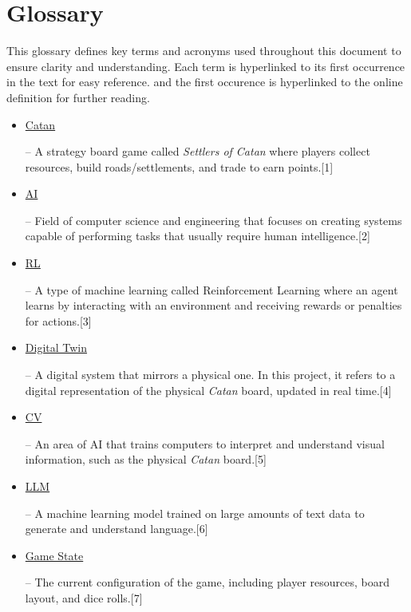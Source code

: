 \documentclass{article}
\newcommand{\CatanExt}{\href{https://en.wikipedia.org/wiki/Catan}{Catan}}
\newcommand{\AIExt}{\href{https://en.wikipedia.org/wiki/Artificial_intelligence}{AI}}
\newcommand{\RLExt}{\href{https://www.ibm.com/think/topics/reinforcement-learning}{RL}}
\newcommand{\DigitalTwinExt}{\href{https://en.wikipedia.org/wiki/Digital_twin}{Digital Twin}}
\newcommand{\CVExt}{\href{https://www.ibm.com/think/topics/computer-vision}{CV}}
\newcommand{\LLMExt}{\href{https://www.cloudflare.com/learning/ai/what-is-large-language-model/}{LLM}}
\newcommand{\GameStateExt}{\href{https://milvus.io/ai-quick-reference/what-is-a-state-in-rl}{Game State}}
\begin{document}
\newpage

\medskip

\hypertarget{glossary-catan}{}
\hypertarget{glossary-ai}{}
\hypertarget{glossary-rl}{}
\hypertarget{glossary-dt}{}
\hypertarget{glossary-cv}{}
\hypertarget{glossary-llm}{}
\hypertarget{glossary-gamestate}{}

\newcommand{\Catan}{\hyperlink{glossary-catan}{Catan}}
\newcommand{\AI}{\hyperlink{glossary-ai}{AI}}
\newcommand{\RL}{\hyperlink{glossary-rl}{RL}}
\newcommand{\DigitalTwin}{\hyperlink{glossary-dt}{Digital Twin}}
\newcommand{\CV}{\hyperlink{glossary-cv}{CV}}
\newcommand{\LLM}{\hyperlink{glossary-llm}{LLM}}
\newcommand{\GameState}{\hyperlink{glossary-gamestate}{Game State}}

\section*{Glossary}
\raggedright This glossary defines key terms and acronyms used throughout this document to ensure clarity and understanding. Each term is hyperlinked to its first occurrence in the text for easy reference. 
and the first occurence is hyperlinked to the online definition for further reading.
\begin{itemize}
    \item \hypertarget{glossary-catan}{\CatanExt{}} – A strategy board game called \textit{Settlers of Catan} where players collect resources, build roads/settlements, and trade to earn points.[1]
    \item \hypertarget{glossary-ai}{\AIExt{}} – Field of computer science and engineering that focuses on creating systems capable of performing tasks that usually require human intelligence.[2]
    \item \hypertarget{glossary-rl}{\RLExt{}} – A type of machine learning called Reinforcement Learning where an agent learns by interacting with an environment and receiving rewards or penalties for actions.[3]
    \item \hypertarget{glossary-dt}{\DigitalTwinExt{}} – A digital system that mirrors a physical one. In this project, it refers to a digital representation of the physical \emph{Catan} board, updated in real time.[4]
    \item \hypertarget{glossary-cv}{\CVExt{}} – An area of AI that trains computers to interpret and understand visual information, such as the physical \emph{Catan} board.[5]
    \item \hypertarget{glossary-llm}{\LLMExt{}} – A machine learning model trained on large amounts of text data to generate and understand language.[6]
    \item \hypertarget{glossary-gamestate}{\GameStateExt{}} – The current configuration of the game, including player resources, board layout, and dice rolls.[7]
\end{itemize}
\end{document}
